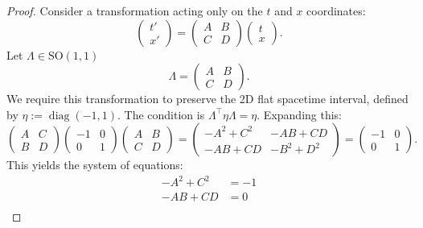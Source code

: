 \documentclass{amsart}
\theoremstyle{definition}
\theoremstyle{remark}
\DeclareMathOperator{\diag}{diag}
\begin{document}
\begin{proof}
  Consider a transformation acting only on the $t$ and $x$ coordinates:
  \begin{equation*}
    \begin{pmatrix}
      t' \\
      x'
    \end{pmatrix} =
    \begin{pmatrix}
      A & B \\
      C & D
    \end{pmatrix}
    \begin{pmatrix}
      t \\
      x
    \end{pmatrix}.
  \end{equation*}
  Let $\Lambda\in\mathrm{SO}(1,1)$
  \begin{equation*}
    \Lambda =
    \begin{pmatrix}
      A & B \\
      C & D
    \end{pmatrix}.
  \end{equation*}
  We require this transformation to preserve the 2D flat spacetime interval, defined by $\eta := \diag(-1, 1)$. The condition is $\Lambda^\top \eta \Lambda = \eta$.
  Expanding this:
  \begin{equation*}
    \begin{pmatrix}
      A & C \\
      B & D
    \end{pmatrix}
    \begin{pmatrix}
      -1 & 0 \\
      0 & 1
    \end{pmatrix}
    \begin{pmatrix}
      A & B \\
      C & D
    \end{pmatrix}
    =
    \begin{pmatrix}
      -A^2 + C^2 & -AB + CD \\
      -AB + CD & -B^2 + D^2
    \end{pmatrix}
    =
    \begin{pmatrix}
      -1 & 0 \\ 0 & 1
    \end{pmatrix}.
  \end{equation*}
  This yields the system of equations:
  \begin{align*}
    -A^2 + C^2 &= -1  \\
    -AB + CD &= 0  \\

\end{align*}
\end{proof}
\end{document}
